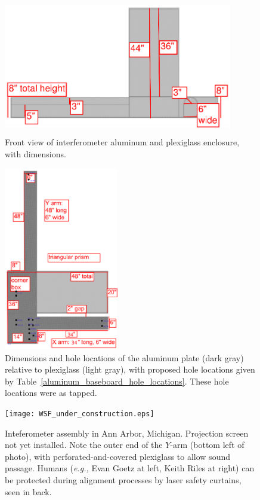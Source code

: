         \begin{figure}
        \begin{center}
        \includegraphics[height=60mm, width=100mm]{view-front.eps}
        \caption{Front view of interferometer aluminum and plexiglass enclosure, with dimensions.}
        \label{plex-view-front}
        \end{center}
        \end{figure}



        \begin{figure}
        \begin{center}
        \includegraphics[height=80mm, width=50mm]{view-top-plate-3.eps}
        \caption{Dimensions and hole locations of the aluminum plate (dark gray) relative to plexiglass (light gray), with proposed hole locations given by Table~\ref{aluminum_baseboard_hole_locations}. These hole locations were as tapped.}
        \label{al_top_plate}
        \end{center}
        \end{figure}


	\begin{figure}
	\begin{center}
	\texttt{[image: WSF\_under\_construction.eps]}
	\caption{Inteferometer assembly in Ann Arbor, Michigan. Projection screen not yet installed. Note the outer end of the $Y$-arm (bottom left of photo), with perforated-and-covered plexiglass to allow sound passage. Humans (\textit{e.g.,} Evan Goetz at left, Keith Riles at right) can be protected during alignment processes by laser safety curtains, seen in back.}
	\label{WSF_in_AA}
	\end{center}
	\end{figure}

